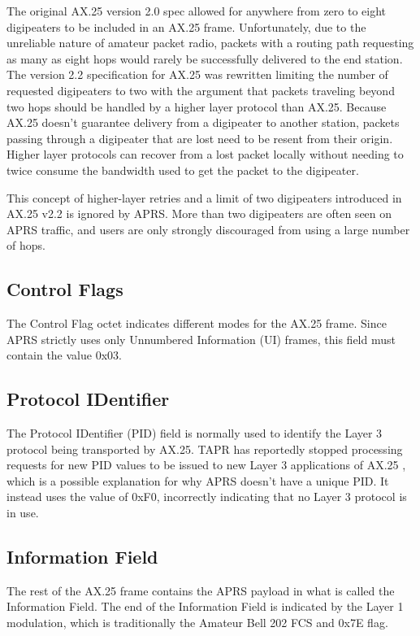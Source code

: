 The original AX.25 version 2.0 spec allowed for anywhere from zero to eight digipeaters to
be included in an AX.25 frame. Unfortunately, due to the unreliable nature of amateur 
packet radio, packets with a routing path requesting as many as eight hops would rarely be 
successfully delivered to the end station.
The version 2.2 specification for AX.25 was
rewritten limiting the number of requested digipeaters to two with the argument that packets
traveling beyond two hops should be handled by a higher layer protocol than AX.25.
Because AX.25 doesn't guarantee delivery from a digipeater to another station,
packets passing through a digipeater that are lost need to be
resent from their origin.
Higher layer protocols can recover from a lost packet locally 
without needing to twice consume
the bandwidth used to get the packet to the digipeater.

This concept of higher-layer retries and a limit of two digipeaters
introduced in AX.25 v2.2 is ignored by APRS.
More than two digipeaters are often seen on APRS traffic, 
and users are only strongly discouraged from using a large number of hops.

\subsection{Control Flags}

The Control Flag octet indicates different modes for the AX.25 frame.
Since APRS strictly uses only Unnumbered Information (UI) frames, this field must
contain the value 0x03.

\subsection{Protocol IDentifier}

The Protocol IDentifier (PID) field is normally used to identify the Layer 3 protocol
being transported by AX.25. TAPR has reportedly stopped processing requests for new PID
values to be issued to new Layer 3 applications of AX.25 \cite{millernopid}, 
which is a possible explanation for why APRS doesn't have a unique PID.
It instead uses the value of 0xF0, incorrectly indicating that no Layer 3 protocol is in use.

\subsection{Information Field}

The rest of the AX.25 frame contains the APRS payload in
what is called the Information Field.
The end of the Information Field is indicated by the Layer 1 modulation, which is traditionally
the Amateur Bell 202 FCS and 0x7E flag.

